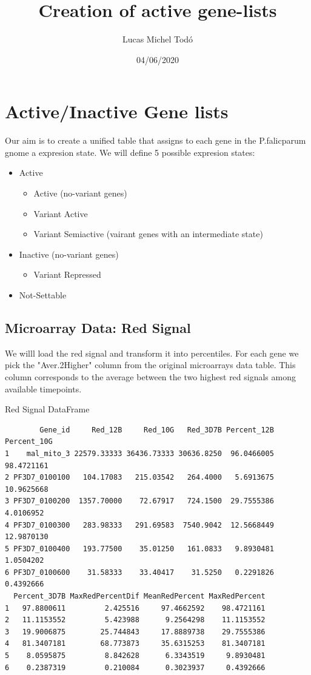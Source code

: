 \documentclass[11pt]{article}
\author{Lucas Michel Todó}
\date{04/06/2020}
\title{Creation of active gene-lists}
\begin{document}
\maketitle
\tableofcontents \clearpage
\section{Active/Inactive Gene lists}
\label{sec:org0f486eb}
Our aim is to create a unified table that assigns to each gene in the P.falicparum gnome a expresion state.
We will define 5 possible expresion states:

\begin{itemize}
\item Active
\begin{itemize}
\item Active (no-variant genes)
\item Variant Active
\item Variant Semiactive (vairant genes with an intermediate state)
\end{itemize}

\item Inactive (no-variant genes)
\begin{itemize}
\item Variant Repressed
\end{itemize}

\item Not-Settable
\end{itemize}

\subsection{Microarray Data: Red Signal}
\label{sec:org3919fd9}
We willl load the red signal and transform it into percentiles. For each gene we pick the "Aver.2Higher" column from the original microarrays data table. This column corresponds to the average between the two highest red signals among available timepoints.

Red Signal DataFrame
\begin{verbatim}
        Gene_id     Red_12B     Red_10G   Red_3D7B Percent_12B Percent_10G
1    mal_mito_3 22579.33333 36436.73333 30636.8250  96.0466005  98.4721161
2 PF3D7_0100100   104.17083   215.03542   264.4000   5.6913675  10.9625668
3 PF3D7_0100200  1357.70000    72.67917   724.1500  29.7555386   4.0106952
4 PF3D7_0100300   283.98333   291.69583  7540.9042  12.5668449  12.9870130
5 PF3D7_0100400   193.77500    35.01250   161.0833   9.8930481   1.0504202
6 PF3D7_0100600    31.58333    33.40417    31.5250   0.2291826   0.4392666
  Percent_3D7B MaxRedPercentDif MeanRedPercent MaxRedPercent
1   97.8800611         2.425516     97.4662592    98.4721161
2   11.1153552         5.423988      9.2564298    11.1153552
3   19.9006875        25.744843     17.8889738    29.7555386
4   81.3407181        68.773873     35.6315253    81.3407181
5    8.0595875         8.842628      6.3343519     9.8930481
6    0.2387319         0.210084      0.3023937     0.4392666
\end{verbatim}
\end{document}

